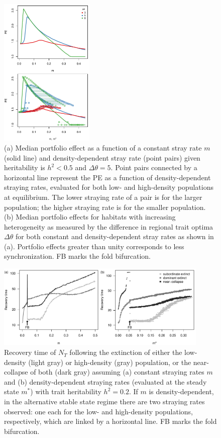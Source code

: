 \documentclass{revtex4}
\begin{document}
\begin{figure}
  \captionsetup{justification=raggedright,
singlelinecheck=false
}
\centering
\includegraphics[width=0.4\textwidth]{figs2/fig_thetaPEmvm.pdf}
\caption{
(a) Median portfolio effect as a function of a constant stray rate $m$ (solid line) and density-dependent stray rate (point pairs) given heritability is $h^2 < 0.5$ and $\Delta\theta=5$.
Point pairs connected by a horizontal line represent the PE as a function of density-dependent straying rates, evaluated for both low- and high-density populations at equilibrium. The lower straying rate of a pair is for the larger population; the higher straying rate is for the smaller population.
(b) Median portfolio effects for habitats with increasing heterogeneity as measured by the difference in regional trait optima $\Delta \theta$ for both constant and density-dependent stray rates as shown in (a).
Portfolio effects greater than unity corresponds to less synchronization.
FB marks the fold bifurcation.
} \label{fig:thetaPE}
\end{figure}

\begin{figure}
  \captionsetup{justification=raggedright,
singlelinecheck=false
}
\centering
\includegraphics[width=0.9\textwidth]{figs2/fig_relax_lowh.pdf}
\caption{
Recovery time of $N_T$ following the extinction of either the low-density (light gray) or high-density (gray) population, or the near-collapse of both (dark gray) assuming (a) constant straying rates $m$ and (b) density-dependent straying rates (evaluated at the steady state $m^*$) with trait heritability $h^2=0.2$.
If $m$ is density-dependent, in the alternative stable state regime there are two straying rates observed: one each for the low- and high-density populations, respectively, which are linked by a horizontal line.
FB marks the fold bifurcation.
} \label{fig:relax}
\end{figure}
\end{document}
